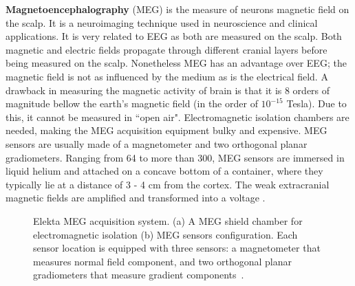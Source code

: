 \textbf{Magnetoencephalography} (MEG) is the measure of neurons magnetic field on the scalp. 
It is a neuroimaging technique used in neuroscience and clinical applications. 
It is very related to EEG as both are measured on the scalp. 
Both magnetic and electric fields propagate through different cranial layers before being measured on the scalp.
Nonetheless MEG has an advantage over EEG; the magnetic field is not as influenced by the medium as is the electrical field. 
A drawback in measuring the magnetic activity of brain is that it is 
8 orders of magnitude bellow 
the earth's magnetic field (in the order of $10^{-15}$ Tesla). 
Due to this, it cannot be measured in ``open air".
Electromagnetic isolation chambers are needed, making the MEG acquisition equipment bulky and expensive. 
MEG sensors are usually made of a magnetometer and two orthogonal planar gradiometers. 
Ranging from 64 to more than 300, MEG sensors are immersed in liquid helium and attached on a concave bottom of a container, where they typically lie at a distance of  3 - 4 cm from the cortex. 
The weak extracranial magnetic fields are amplified and transformed into a voltage \citep{paetau_magnetoencephalography_2002}.



\begin{figure}[h!]
\centering
{}
\caption{Elekta MEG acquisition system. (a) A MEG shield chamber for electromagnetic isolation  (b) MEG sensors configuration. Each sensor location is equipped with three sensors: a magnetometer  that measures normal field component, and two orthogonal planar gradiometers that measure gradient components~\citep{team_elekta_2016}.}
\label{fig:meg-system}
\end{figure} 

